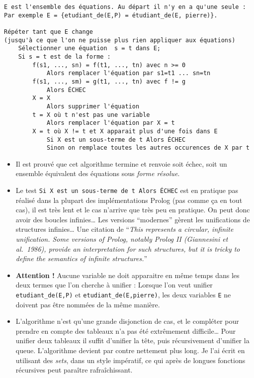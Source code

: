 \documentclass{article}
\begin{document}
\begin{verbatim}
E est l'ensemble des équations. Au départ il n'y en a qu'une seule :
Par exemple E = {etudiant_de(E,P) = étudiant_de(E, pierre)}.

Répéter tant que E change
(jusqu'à ce que l'on ne puisse plus rien appliquer aux équations)
    Sélectionner une équation  s = t dans E;
    Si s = t est de la forme :
        f(s1, ..., sn) = f(t1, ..., tn) avec n >= 0
            Alors remplacer l'équation par s1=t1 ... sn=tn
        f(s1, ..., sm) = g(t1, ..., tn) avec f != g
            Alors ÉCHEC
        X = X
            Alors supprimer l'équation
        t = X où t n'est pas une variable
            Alors remplacer l'équation par X = t
        X = t où X != t et X apparait plus d'une fois dans E
            Si X est un sous-terme de t Alors ÉCHEC
            Sinon on remplace toutes les autres occurences de X par t
\end{verbatim}

\begin{itemize}
  \item
    Il est prouvé que cet algorithme termine et renvoie soit échec, soit un ensemble équivalent des équations sous \emph{forme résolue}.
  \item
    Le test \texttt{Si X est un sous-terme de t Alors ÉCHEC} est en pratique pas réalisé dans la plupart des implémentations Prolog (pas comme ça en tout cas), il est très lent et le cas n'arrive que très peu en pratique. On peut donc avoir des boucles infinies\ldots{} Les versions ``modernes'' gèrent les unifications de structures infinies\ldots{} Une citation de \cite{Norvig} ``\emph{This represents a circular, infinite unification. Some versions of Prolog, notably Prolog II (Giannesini et al.~1986), provide an interpretation for such structures, but it is tricky to define the semantics of infinite structures.}''
  \item
    \textbf{Attention !} Aucune variable ne doit apparaitre en même temps dans les deux termes que l'on cherche à unifier : Lorsque l'on veut unifier \texttt{etudiant\_de(E,P)} et \texttt{etudiant\_de(E,pierre)}, les deux variables \texttt{E} ne doivent pas être nommées de la même manière.
  \item
    L'algorithme n'est qu'une grande disjonction de cas, et le compléter pour prendre en compte des tableaux n'a pas été extrêmement difficile\ldots{} Pour unifier deux tableaux il suffit d'unifier la tête, puis récursivement d'unifier la queue. L'algorithme devient par contre nettement plus long. Je l'ai écrit en utilisant des \emph{sets}, dans un style impératif, ce qui après de longues fonctions récursives peut paraître rafraîchissant.
\end{itemize}
\end{document}
